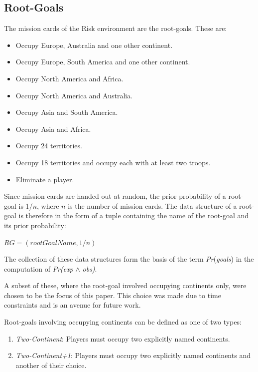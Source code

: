 \documentclass[parskip]{cs4rep}
\begin{document}
\subsection{Root-Goals}

The mission cards of the Risk environment are the root-goals. These are:

\begin{itemize}
\item
Occupy Europe, Australia and one other continent.
\item
Occupy Europe, South America and one other continent.
\item
Occupy North America and Africa.
\item
Occupy North America and Australia.
\item
Occupy Asia and South America.
\item
Occupy Asia and Africa.
\item
Occupy 24 territories.
\item
Occupy 18 territories and occupy each with at least two troops.
\item
Eliminate a player.
\end{itemize}

Since mission cards are handed out at random, the prior probability of a root-goal is 1/$n$, where $n$ is the number of mission cards. The data structure of a root-goal is therefore in the form of a tuple containing the name of the root-goal and its prior probability: 

\centerline{
 $RG = ( rootGoalName, 1/n)$\newline
}

The collection of these data structures form the basis of the term \textit{Pr}(\textit{goals}) in the computation of \textit{Pr(exp} $\wedge$ \textit{obs)}.

A subset of these, where the root-goal involved occupying continents only, were chosen to be the focus of this paper. This choice was made due to time constraints and is an avenue for future work.

Root-goals involving occupying continents can be defined as one of two types:

\begin{enumerate}
\item
\textit{Two-Continent}: Players must occupy two explicitly named continents.
\item
\textit{Two-Continent+1}: Players must occupy two explicitly named continents and another of their choice.
\end{enumerate}
\end{document}

